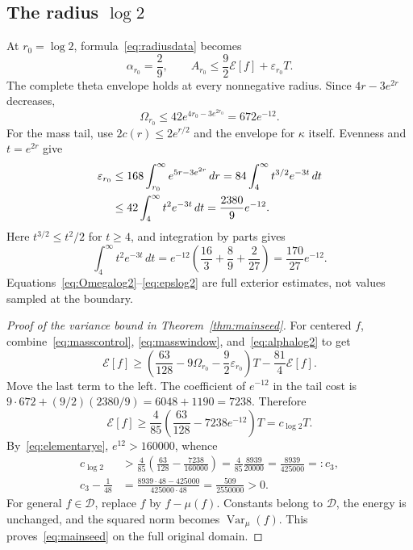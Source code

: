 \documentclass[11pt,a4paper]{article}
\numberwithin{equation}{section}
\theoremstyle{remark}
\newcommand{\E}{\mathcal E}
\newcommand{\D}{\mathcal D}
\newcommand{\Var}{\operatorname{Var}}
\begin{document}
\subsection{The radius \texorpdfstring{$\log2$}{log 2}}

At $r_0=\log2$, formula~\eqref{eq:radiusdata} becomes
\begin{equation}\label{eq:alphalog2}
 \alpha_{r_0}=\frac29,\qquad
 A_{r_0}\le\frac92\E[f]+\varepsilon_{r_0}T.
\end{equation}
The complete theta envelope holds at every nonnegative radius. Since $4r-3e^{2r}$ decreases,
\begin{equation}\label{eq:Omegalog2}
 \Omega_{r_0}\le42e^{4r_0-3e^{2r_0}}=672e^{-12}.
\end{equation}
For the mass tail, use $2c(r)\le2e^{r/2}$ and the envelope for $\kappa$ itself. Evenness and $t=e^{2r}$ give
\begin{align}
 \varepsilon_{r_0}
 &\le168\int_{r_0}^\infty e^{5r-3e^{2r}}\,dr
 =84\int_4^\infty t^{3/2}e^{-3t}\,dt\notag\\
 &\le42\int_4^\infty t^2e^{-3t}\,dt
 =\frac{2380}{9}e^{-12}.\label{eq:epslog2}
\end{align}
Here $t^{3/2}\le t^2/2$ for $t\ge4$, and integration by parts gives
\[
 \int_4^\infty t^2e^{-3t}\,dt
 =e^{-12}\left(\frac{16}{3}+\frac89+\frac2{27}\right)
 =\frac{170}{27}e^{-12}.
\]
Equations~\eqref{eq:Omegalog2}--\eqref{eq:epslog2} are full exterior estimates, not values sampled at the boundary.

\begin{proof}[Proof of the variance bound in Theorem~\ref{thm:mainseed}]
For centered $f$, combine~\eqref{eq:masscontrol}, \eqref{eq:masswindow}, and~\eqref{eq:alphalog2} to get
\[
 \E[f]\ge\left(\frac{63}{128}-9\Omega_{r_0}
                       -\frac92\varepsilon_{r_0}\right)T
                         -\frac{81}{4}\E[f].
\]
Move the last term to the left. The coefficient of $e^{-12}$ in the tail cost is
$9\cdot672+(9/2)(2380/9)=6048+1190=7238$. Therefore
\[
 \E[f]\ge\frac4{85}\left(\frac{63}{128}-7238e^{-12}\right)T
 =c_{\log2}T.
\]
By~\eqref{eq:elementarye}, $e^{12}>160000$, whence
\begin{align*}
 c_{\log2}&>\frac4{85}\left(\frac{63}{128}-\frac{7238}{160000}\right)
 =\frac4{85}\frac{8939}{20000}=\frac{8939}{425000}=:c_3,\\
 c_3-\frac1{48}
 &=\frac{8939\cdot48-425000}{425000\cdot48}
 =\frac{509}{2550000}>0.
\end{align*}
For general $f\in\D$, replace $f$ by $f-\mu(f)$. Constants belong to $\D$, the energy is unchanged, and the squared norm becomes $\Var_\mu(f)$. This proves~\eqref{eq:mainseed} on the full original domain.
\end{proof}
\end{document}
